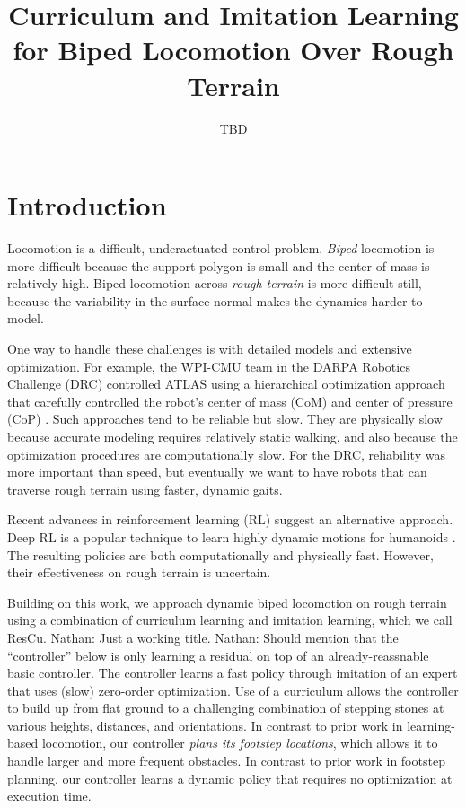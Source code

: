 \documentclass[a4paper]{article}
\title{Curriculum and Imitation Learning for Biped Locomotion Over Rough Terrain}
\author{TBD}
\newcommand{\nhatch}[1]{{\leavevmode\color{blue} Nathan: #1}}
\begin{document}
\maketitle

\section{Introduction}

Locomotion is a difficult, underactuated control problem.
\emph{Biped} locomotion is more difficult because the support polygon is small and the center of mass is relatively high.
Biped locomotion across \emph{rough terrain} is more difficult still, because the variability in the surface normal makes the dynamics harder to model.

One way to handle these challenges is with detailed models and extensive optimization.
For example, the WPI-CMU team in the DARPA Robotics Challenge (DRC) controlled ATLAS using a hierarchical optimization approach that carefully controlled the robot's center of mass (CoM) and center of pressure (CoP) \citep{feng2015optimization}.
Such approaches tend to be reliable but slow.
They are physically slow because accurate modeling requires relatively static walking, and also because the optimization procedures are computationally slow.
For the DRC, reliability was more important than speed, but eventually we want to have robots that can traverse rough terrain using faster, dynamic gaits.

Recent advances in reinforcement learning (RL) suggest an alternative approach.
Deep RL is a popular technique to learn highly dynamic motions for humanoids \citep{peng2018deepmimic, heess2017emergence}.
The resulting policies are both computationally and physically fast.
However, their effectiveness on rough terrain is uncertain.

Building on this work, we approach dynamic biped locomotion on rough terrain using a combination of curriculum learning and imitation learning, which we call ResCu. \nhatch{Just a working title.}
\nhatch{Should mention that the ``controller'' below is only learning a residual on top of an already-reassnable basic controller.}
The controller learns a fast policy through imitation of an expert that uses (slow) zero-order optimization.
Use of a curriculum allows the controller to build up from flat ground to a challenging combination of stepping stones at various heights, distances, and orientations.
In contrast to prior work in learning-based locomotion, our controller \emph{plans its footstep locations}, which allows it to handle larger and more frequent obstacles.
In contrast to prior work in footstep planning, our controller learns a dynamic policy that requires no optimization at execution time.
\end{document}
